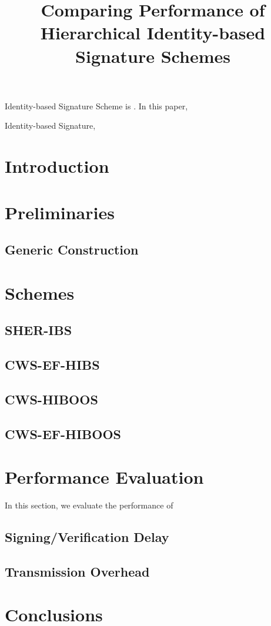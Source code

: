 \documentclass[letter]{ieice}
\title{Comparing Performance of Hierarchical Identity-based Signature Schemes}
\begin{document}
\maketitle
\begin{summary}
Identity-based Signature Scheme is .
In this paper, 
\end{summary}
\begin{keywords}
Identity-based Signature, 
\end{keywords}

\section{Introduction}

\section{Preliminaries}
\subsection{Generic Construction}

\section{Schemes}
\subsection{SHER-IBS}
\subsection{CWS-EF-HIBS}
\subsection{CWS-HIBOOS}
\subsection{CWS-EF-HIBOOS}

\section{Performance Evaluation}
In this section, we evaluate the performance of

\subsection{Signing/Verification Delay}
\subsection{Transmission Overhead}

\section{Conclusions}


\begin{thebibliography}{99}%
\bibitem{}
\end{thebibliography}

\end{document}
